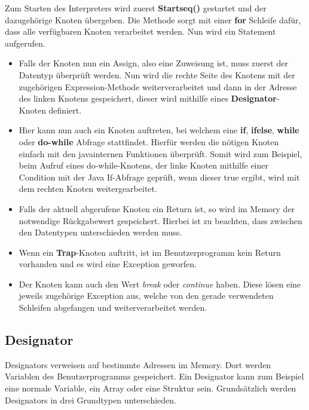 Zum Starten des Interpreters wird zuerst \textbf{Startseq()} gestartet und der dazugehörige Knoten übergeben. Die Methode sorgt mit einer \textbf{for} Schleife dafür, dass alle verfügbaren Knoten verarbeitet werden. Nun wird ein Statement aufgerufen. 
\begin{itemize}
\item Falls der Knoten nun ein Assign, also eine Zuweisung ist, muss zuerst der Datentyp überprüft werden. Nun wird die rechte Seite des Knotens mit der zugehörigen Expression-Methode weiterverarbeitet und dann in der Adresse des linken Knotens gespeichert, dieser wird mithilfe eines \textbf{Designator}-Knoten definiert.
\item Hier kann nun auch ein Knoten auftreten, bei welchem eine \textbf{if}, \textbf{ifelse}, \textbf{while} oder \textbf{do-while} Abfrage stattfindet. Hierfür werden die nötigen Knoten einfach mit den javainternen Funktionen überprüft. Somit wird zum Beispiel, beim Aufruf eines do-while-Knotens, der linke Knoten mithilfe einer Condition mit der Java If-Abfrage geprüft, wenn dieser true ergibt, wird mit dem rechten Knoten weitergearbeitet.
\item Falls der aktuell abgerufene Knoten ein Return ist, so wird im Memory der notwendige Rückgabewert gespeichert. Hierbei ist zu beachten, dass zwischen den Datentypen unterschieden werden muss.
\item Wenn ein \textbf{Trap}-Knoten auftritt, ist im Benutzerprogramm kein Return vorhanden und es wird eine Exception geworfen.
\item Der Knoten kann auch den Wert \textit{break} oder \textit{continue} haben. Diese lösen eine jeweils zugehörige Exception aus, welche von den gerade verwendeten Schleifen abgefangen und weiterverarbeitet werden.
\end{itemize}

\subsection{Designator}
Designators verweisen auf bestimmte Adressen im Memory. Dort werden Variablen des Benutzerprogramms gespeichert. Ein Designator kann zum Beispiel eine normale Variable, ein Array oder eine Struktur sein. Grundsätzlich werden Designators in drei Grundtypen unterschieden.

